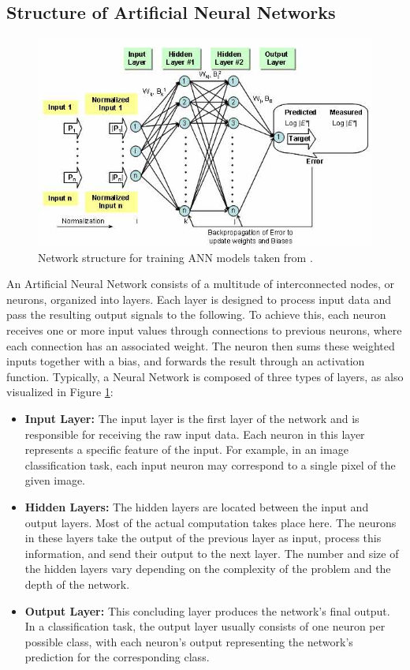 \documentclass[12pt,fleqn,a4paper]{article}
\begin{document}
\subsection{Structure of Artificial Neural Networks}

\begin{figure}[H]
    \centering
    \includegraphics[width=0.56\linewidth]{graphs/annStructure.jpg}
    \caption{Network structure for training ANN models taken from \cite{FHWA}.}
    \label{fig:annStruct}
\end{figure}

An Artificial Neural Network consists of a multitude of interconnected nodes, or neurons, organized into layers. Each layer is designed to process input data and pass the resulting output signals to the following. To achieve this, each neuron receives one or more input values through connections to previous neurons, where each connection has an associated weight. The neuron then sums these weighted inputs together with a bias, and forwards the result through an activation function. Typically, a Neural Network is composed of three types of layers, as also visualized in Figure \ref{fig:annStruct}:

\begin{itemize}
     \item \textbf{Input Layer:} The input layer is the first layer of the network and is responsible for receiving the raw input data. Each neuron in this layer represents a specific feature of the input. For example, in an image classification task, each input neuron may correspond to a single pixel of the given image.
     \item \textbf{Hidden Layers:} The hidden layers are located between the input and output layers. Most of the actual computation takes place here. The neurons in these layers take the output of the previous layer as input, process this information, and send their output to the next layer. The number and size of the hidden layers vary depending on the complexity of the problem and the depth of the network.
     \item \textbf{Output Layer:} This concluding layer produces the network's final output. In a classification task, the output layer usually consists of one neuron per possible class, with each neuron's output representing the network's prediction for the corresponding class.
\end{itemize}
\end{document}
